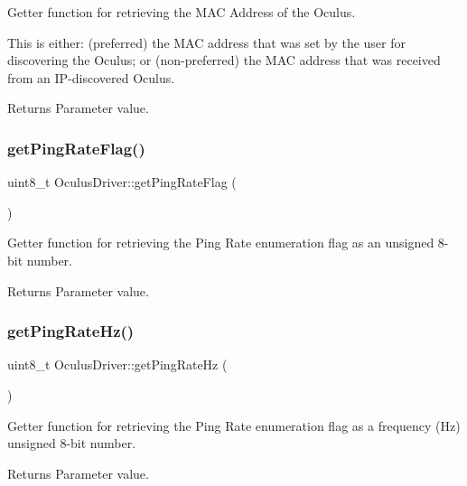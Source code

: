 Getter function for retrieving the M\+AC Address of the Oculus.

This is either\+: (preferred) the M\+AC address that was set by the user for discovering the Oculus; or (non-\/preferred) the M\+AC address that was received from an I\+P-\/discovered Oculus.

\begin{DoxyReturn}{Returns}
Parameter value. 
\end{DoxyReturn}
\mbox{\label{classOculusDriver_a3c5fb2a81d6f9366b82c247b682b890e}} 
\subsubsection{\texorpdfstring{get\+Ping\+Rate\+Flag()}{getPingRateFlag()}}
{\footnotesize\ttfamily uint8\+\_\+t Oculus\+Driver\+::get\+Ping\+Rate\+Flag (\begin{DoxyParamCaption}{ }\end{DoxyParamCaption})}

Getter function for retrieving the Ping Rate enumeration flag as an unsigned 8-\/bit number.

\begin{DoxyReturn}{Returns}
Parameter value. 
\end{DoxyReturn}
\mbox{\label{classOculusDriver_a6dfc4d095d04072851ce4c2c77a0d4bc}} 
\subsubsection{\texorpdfstring{get\+Ping\+Rate\+Hz()}{getPingRateHz()}}
{\footnotesize\ttfamily uint8\+\_\+t Oculus\+Driver\+::get\+Ping\+Rate\+Hz (\begin{DoxyParamCaption}{ }\end{DoxyParamCaption})}

Getter function for retrieving the Ping Rate enumeration flag as a frequency (Hz) unsigned 8-\/bit number.

\begin{DoxyReturn}{Returns}
Parameter value. 
\end{DoxyReturn}
\mbox{\label{classOculusDriver_a385145e8753891fc07f2e736a12be6d1}} 
